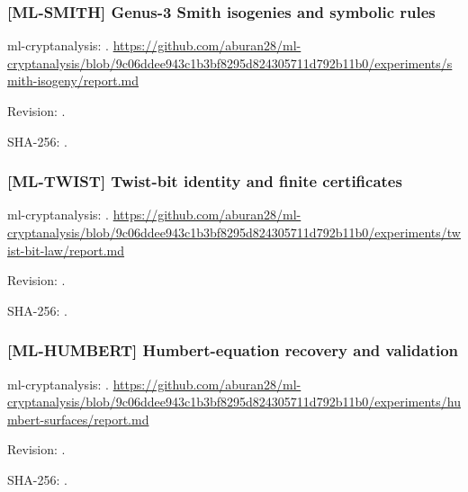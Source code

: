 \par\noindent\begin{minipage}{\linewidth}\small
\subsubsection*{[ML-SMITH] Genus-3 Smith isogenies and symbolic rules}\label{art:ML-SMITH}
ml-cryptanalysis: .
\url{https://github.com/aburan28/ml-cryptanalysis/blob/9c06ddee943c1b3bf8295d824305711d792b11b0/experiments/smith-isogeny/report.md}
\par Revision: .
\par SHA-256: .
\end{minipage}\par\medskip

\par\noindent\begin{minipage}{\linewidth}\small
\subsubsection*{[ML-TWIST] Twist-bit identity and finite certificates}\label{art:ML-TWIST}
ml-cryptanalysis: .
\url{https://github.com/aburan28/ml-cryptanalysis/blob/9c06ddee943c1b3bf8295d824305711d792b11b0/experiments/twist-bit-law/report.md}
\par Revision: .
\par SHA-256: .
\end{minipage}\par\medskip

\par\noindent\begin{minipage}{\linewidth}\small
\subsubsection*{[ML-HUMBERT] Humbert-equation recovery and validation}\label{art:ML-HUMBERT}
ml-cryptanalysis: .
\url{https://github.com/aburan28/ml-cryptanalysis/blob/9c06ddee943c1b3bf8295d824305711d792b11b0/experiments/humbert-surfaces/report.md}
\par Revision: .
\par SHA-256: .
\end{minipage}\par\medskip

